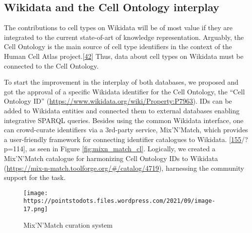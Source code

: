 
\hypertarget{wikidata-and-the-cell-ontology-interplay}{%
\subsection{Wikidata and the Cell Ontology interplay}\label{wikidata-and-the-cell-ontology-interplay}}

The contributions to cell types on Wikidata will be of most value if they are integrated to the current state-of-art of knowledge representation.
Arguably, the Cell Ontology is the main source of cell type identifiers in the context of the Human Cell Atlas project.{[}\protect\hyperlink{ref-qT8WxqjA}{42}{]}
Thus, data about cell types on Wikidata must be connected to the Cell Ontology.

To start the improvement in the interplay of both databases, we proposed and got the approval of a specific Wikidata identifier for the Cell Ontology, the ``Cell Ontology ID'' (\url{https://www.wikidata.org/wiki/Property:P7963}).
IDs can be added to Wikidata entities and connected them to external databases enabling integrative SPARQL queries.
Besides using the common Wikidata interface, one can crowd-curate identifiers via a 3rd-party service, Mix'N'Match, which provides a user-friendly framework for connecting identifier catalogues to Wikidata. {[}\protect\hyperlink{ref-JgiKEEdq}{155}/?p=114{]}, as seen in Figure \ref{fig:mixn_match_cl}.
Logically, we created a Mix'N'Match catalogue for harmonizing Cell Ontology IDs to Wikidata (\url{https://mix-n-match.toolforge.org/\#/catalog/4719}), harnessing the community support for the task.

\begin{figure}
\hypertarget{fig:mixnmatch_cl}{%
\centering
\texttt{[image: https://pointstodots.files.wordpress.com/2021/09/image-17.png]}
\caption{Mix'N'Match curation system}\label{fig:mixnmatch_cl}
}
\end{figure}
